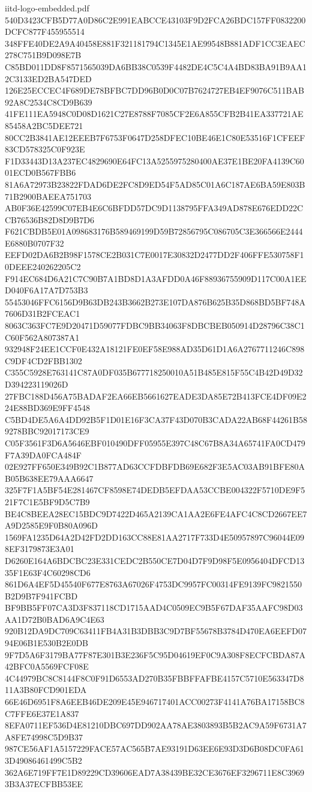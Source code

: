 \begin{filecontents*}[overwrite]{iitd-logo-embedded.pdf}
540D3423CFB5D77A0D86C2E991EABCCE43103F9D2FCA26BDC157FF0832200DCFC877F455955514
348FFE40DE2A9A40458E881F321181794C1345E1AE99548B881ADF1CC3EAEC278C751B9D098E7B
C85BD011DD8F8571565039DA6BB38C0539F4482DE4C5C4A4BD83BA91B9AA12C3133ED2BA547DED
126E25ECCEC4F689DE78BFBC7DD96B0D0C07B7624727EB4EF9076C511BAB92A8C2534C8CD9B639
41FE111EA5948C0D08D1621C27E8788F7085CF2E6A855CFB2B41EA337721AE85458A2BC5DEE721
80CC2B3841AE12EEEB7F6753F0647D258DFEC10BE46E1C80E53516F1CFEEF83CD578325C0F923E
F1D33443D13A237EC4829690E64FC13A5255975280400AE37E1BE20FA4139C6001ECD0B567FBB6
81A6A72973B23822FDAD6DE2FC8D9ED54F5AD85C01A6C187AE6BA59E803B71B2900BAEEA751703
AB0F36E42599C07EB4E6C6BFDD57DC9D1138795FFA349AD878E676EDD22CCB76536B82D8D9B7D6
F621CBDB5E01A098683176B589469199D59B72856795C086705C3E366566E2444E6880B0707F32
EEFD02DA6B2B98F1578CE2B031C7E0017E30832D2477DD2F406FFE530758F10DEEE240262205C2
F914EC684D6A21C7C90B7A1BD8D1A3AFDD0A46F88936755909D117C00A1EED040F6A17A7D753B3
55453046FFC6156D9B63DB243B3662B273E107DA876B625B35D868BD5BF748A7606D31B2FCEAC1
8063C363FC7E9D20471D59077FDBC9BB34063F8DBCBEB050914D28796C38C1C60F562A807387A1
932948F24EE1CCF0E432A18121FE0EF58E988AD35D61D1A6A2767711246C898C9DF4CD2FBB1302
C355C5928E763141C87A0DF035B677718250010A51B485E815F55C4B42D49D32D394223119026D
27FBC188D456A75BADAF2EA66EB5661627EADE3DA85E72B413FCE4DF09E224E88BD369E9FF4548
C5BD4DE5A6A4DD92B5F1D01E16F3CA37F43D070B3CADA22AB68F44261B589278BBC92017173CE9
C05F3561F3D6A5646EBF010490DFF05955E397C48C67B8A34A65741FA0CD479F7A39DA0FCA484F
02E927FF650E349B92C1B877AD63CCFDBFDB69E682F3E5AC03AB91BFE80AB05B638EE79AAA6647
325F7F1A5BF54E281467CF8598E74DEDB5EFDAA53CCBE004322F5710DE9F521F7C1E5BF9D5C7B9
BE4C8BEEA28EC15BDC9D7422D465A2139CA1AA2E6FE4AFC4C8CD2667EE7A9D2585E9F0B80A096D
1569FA1235D64A2D42FD2DD163CC88E81AA2717F733D4E50957897C96044E098EF3179873E3A01
D6260E164A6BDCBC23E331CEDC2B550CE7D04D7F9D98F5E0956404DFCD1335F1E63F4C60298CD6
861D6A4EF5D45540F677E8763A67026F4753DC9957FC00314FE9139FC9821550B2D9B7F941FCBD
BF9BB5FF07CA3D3F837118CD1715AAD4C0509EC9B5F67DAF35AAFC98D03AA1D72B0BAD6A9C4E63
920B12DA9DC709C63411FB4A31B3DBB3C9D7BF55678B3784D470EA6EEFD0794E06B1E530B2E0DB
9F7D5A6F3179BA77F87E301B3E236F5C95D04619EF0C9A308F8ECFCBDA87A42BFC0A5569FCF08E
4C44979BC8C8144F8C0F91D6553AD270B35FBBFFAFBE4157C5710E563347D811A3B80FCD901EDA
66E46D6951F8A6EEB46DE209E45E946717401ACC00273F4141A76BA17158BC8C7FFE6E37E1A837
8EFA0711EF536D4E81210DBC697DD902AA78AE3803893B5B2AC9A59F6731A7A8FE74998C5D9B37
987CE56AF1A5157229FACE57AC565B7AE93191D63EE6E93D3D6B08DC0FA613D49086461499C5B2
362A6E719FF7E1D89229CD39606EAD7A38439BE32CE3676EF3296711E8C39693B3A37ECFBB53EE

\end{filecontents*}
